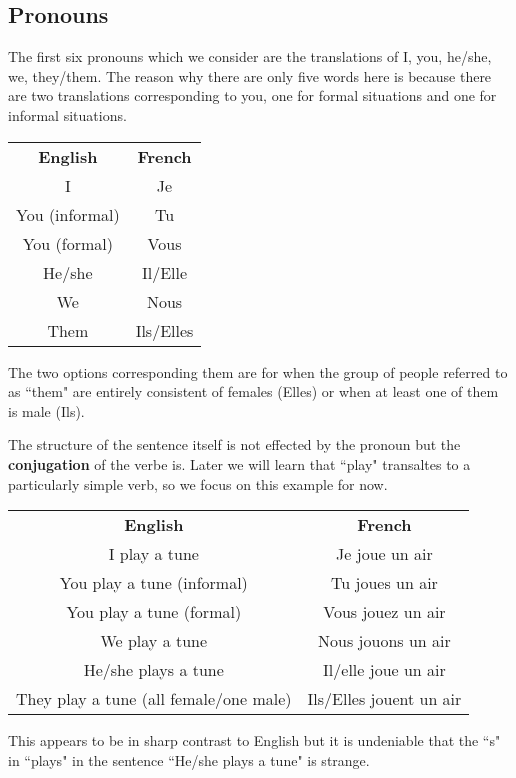 \documentclass[12pt]{article}
\theoremstyle{plain}
\theoremstyle{definition}
\begin{document}
	\subsection{Pronouns}
	The first six pronouns which we consider are the translations of I, you, he/she, we, they/them. The reason why there are only five words here is because there are two translations corresponding to you, one for formal situations and one for informal situations.
	\begin{center}
		\begin{tabular}{| c | c |}
			\hline
			\textbf{English} & \textbf{French}\\
			I & Je\\
			You (informal) & Tu\\
			You (formal) & Vous\\
			He/she & Il/Elle\\
			We & Nous\\
			Them & Ils/Elles\\
			\hline
			\end{tabular}
		\end{center}
	The two options corresponding them are for when the group of people referred to as ``them" are entirely consistent of females (Elles) or when at least one of them is male (Ils).
	
	The structure of the sentence itself is not effected by the pronoun but the \textbf{conjugation} of the verbe is. Later we will learn that ``play" transaltes to a particularly simple verb, so we focus on this example for now.
	
	\begin{center}
		\begin{tabular}{| c | c |}
			\hline
			\textbf{English} & \textbf{French}\\
			I play a tune & Je joue un air\\
			You play a tune (informal) & Tu joues un air\\
			You play a tune (formal) & Vous jouez un air\\
			We play a tune & Nous jouons un air\\
			He/she plays a tune & Il/elle joue un air\\
			They play a tune (all female/one male) & Ils/Elles jouent un air\\
			\hline
			\end{tabular}
		\end{center}
	This appears to be in sharp contrast to English but it is undeniable that the ``s" in ``plays" in the sentence ``He/she plays a tune" is strange.
	
\end{document}
